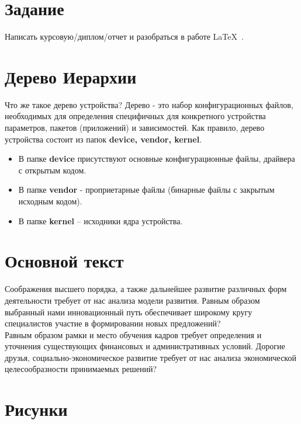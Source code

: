 
\section*{Задание}
Написать курсовую/диплом/отчет и разобраться в работе \LaTeX\ .

\section{Дерево Иерархии}
Что же такое дерево устройства? Дерево - это набор конфигурационных
файлов, необходимых для определения специфичных для конкретного устройства параметров, пакетов (приложений) и зависимостей. Как правило, дерево устройства состоит из папок \textbf{device, vendor, kernel}.
\begin{itemize}
\item В папке \textbf{device} присутствуют основные конфигурационные файлы, драйвера с открытым кодом.
\item В папке \textbf{vendor} - проприетарные файлы (бинарные файлы с закрытым исходным кодом).
\item В папке \textbf{kernel} – исходники ядра устройства.
\end{itemize}


\section{Основной текст}
Соображения высшего порядка, а также дальнейшее развитие различных форм деятельности требует от нас анализа модели развития. Равным образом выбранный нами инновационный путь обеспечивает широкому кругу специалистов участие в формировании новых предложений?\\
Равным образом рамки и место обучения кадров требует определения и уточнения существующих финансовых и административных условий.
Дорогие друзья, социально-экономическое развитие требует от нас анализа экономической целесообразности принимаемых решений? \cite{kistyakovskii} %

\section{Рисунки}



